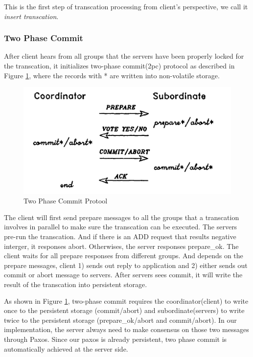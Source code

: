 \documentclass{vldb}
\begin{document}
This is the first step of transcation processing from client's perspective, we call
it \textit{insert transcation}.


\subsubsection{Two Phase Commit}
\label{sec:2pc}

After client hears from all groups that the servers have been properly locked for the
transcation, it initializes two-phase commit(2pc) protocol as described in Figure
\ref{fig:2pc}, where the records with * are written into non-volatile storage.

\begin{figure}[h!]
  \centering
  \includegraphics[width = 0.8\linewidth]{figs/2PC.pdf}
  \caption{Two Phase Commit Protool}
  \label{fig:2pc}
\end{figure}

The client will first send prepare messages to all the groups that a transcation
involves in parallel to make sure the transcation can be executed. The servers
pre-run the transcation. And if there is an ADD request that results negative
interger, it responses abort. Otherwises, the server responses prepare\_ok. The
client waits for all prepare responses from different groups. And depends on the
prepare messages, client 1) sends out reply to application and 2) either sends out
commit or abort message to servers. After servers sees commit, it will write the
result of the transcation into persistent storage.

As shown in Figure \ref{fig:2pc}, two-phase commit requires the coordinator(client)
to write once to the persistent storage (commit/abort) and subordinate(servers) to
write twice to the persistent storage (prepare\_ok/abort and commit/abort). In our
implementation, the server always need to make consensus on those two messages
through Paxos. Since our paxos is already persistent, two phase commit is
automatically achieved at the server side. 
\end{document}
